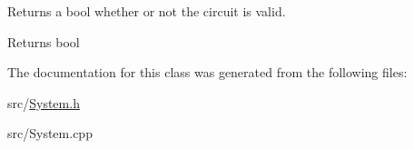 Returns a bool whether or not the circuit is valid. 

\begin{DoxyReturn}{Returns}
bool 
\end{DoxyReturn}


The documentation for this class was generated from the following files\+:\begin{DoxyCompactItemize}
\item 
src/\hyperlink{System_8h}{System.\+h}\item 
src/System.\+cpp\end{DoxyCompactItemize}
